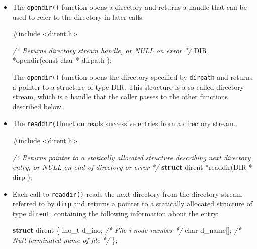 \documentclass[]{article}
\newenvironment{Shaded}{}{}
\newcommand{\KeywordTok}[1]{\textcolor[rgb]{0.00,0.44,0.13}{\textbf{#1}}}
\newcommand{\DataTypeTok}[1]{\textcolor[rgb]{0.56,0.13,0.00}{#1}}
\newcommand{\ImportTok}[1]{#1}
\newcommand{\CommentTok}[1]{\textcolor[rgb]{0.38,0.63,0.69}{\textit{#1}}}
\newcommand{\PreprocessorTok}[1]{\textcolor[rgb]{0.74,0.48,0.00}{#1}}
\newcommand{\NormalTok}[1]{#1}
\begin{document}
\begin{itemize}
\item
  The \texttt{opendir()} function opens a directory and returns a handle
  that can be used to refer to the directory in later calls.

\begin{Shaded}
\begin{Highlighting}[]
\PreprocessorTok{#include }\ImportTok{<dirent.h>}

\CommentTok{/* Returns directory stream handle, or NULL on error */}
\NormalTok{DIR *opendir(}\DataTypeTok{const} \DataTypeTok{char}\NormalTok{ * dirpath );}
\end{Highlighting}
\end{Shaded}

  The \texttt{opendir()} function opens the directory specified by
  \texttt{dirpath} and returns a pointer to a structure of type DIR.
  This structure is a so-called directory stream, which is a handle that
  the caller passes to the other functions described below.
\item
  The \texttt{readdir()}function reads successive entries from a
  directory stream.

\begin{Shaded}
\begin{Highlighting}[]
\PreprocessorTok{#include }\ImportTok{<dirent.h>}

\CommentTok{/* }
\CommentTok{    Returns pointer to a statically allocated structure describing }
\CommentTok{    next directory entry, or NULL on end-of-directory or error}
\CommentTok{*/}
\KeywordTok{struct}\NormalTok{ dirent *readdir(DIR * dirp );}
\end{Highlighting}
\end{Shaded}
\item
  Each call to \texttt{readdir()} reads the next directory from the
  directory stream referred to by \texttt{dirp} and returns a pointer to
  a statically allocated structure of type \texttt{dirent}, containing
  the following information about the entry:

\begin{Shaded}
\begin{Highlighting}[]
\KeywordTok{struct}\NormalTok{ dirent \{}
\NormalTok{    ino_t d_ino;		}\CommentTok{/* File i-node number */}
    \DataTypeTok{char}\NormalTok{ d_name[];		}\CommentTok{/* Null-terminated name of file */}
\NormalTok{\};}
\end{Highlighting}
\end{Shaded}


\end{itemize}
\end{document}
